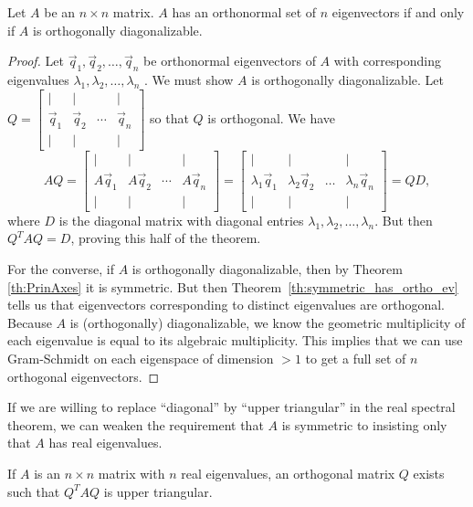 \documentclass{ximera}
\begin{document}
\begin{theorem}\label{th:PrinAxesOtherStuff}
Let $A$ be an $n \times n$ matrix.  $A$ has an orthonormal set of $n$ eigenvectors if and only if $A$ is orthogonally diagonalizable.

\begin{proof}
Let $\vec{q}_{1}, \vec{q}_{2}, \dots, \vec{q}_{n}$ be orthonormal eigenvectors of $A$ with corresponding eigenvalues $\lambda_1, \lambda_2, \ldots, \lambda_n$ .  We must show $A$ is orthogonally diagonalizable. Let $Q = \begin{bmatrix}
| & | &   & | \\
\vec{q}_1 & \vec{q}_2  & \cdots & \vec{q}_n \\
| & | &   & |
\end{bmatrix}$ so that $Q$ is orthogonal.  We have
$$AQ = \begin{bmatrix}
| & | &   & | \\
A\vec{q}_1 & A\vec{q}_2  & \cdots & A\vec{q}_n \\
| & | &   & |
\end{bmatrix} = \begin{bmatrix}
| & | &   & | \\
\lambda_1 \vec{q}_{1} & \lambda_2 \vec{q}_{2} & \dots & \lambda_n \vec{q}_{n} \\
| & | &   & |
\end{bmatrix}=QD, $$
where $D$ is the diagonal matrix with diagonal entries $\lambda_1, \lambda_2, \ldots, \lambda_n$.  But then $Q^TAQ=D$, proving this half of the theorem.

For the converse, if $A$ is orthogonally diagonalizable, then by Theorem \ref{th:PrinAxes} it is symmetric.  But then Theorem~\ref{th:symmetric_has_ortho_ev} tells us that eigenvectors corresponding to distinct eigenvalues are orthogonal.  Because $A$ is (orthogonally) diagonalizable, we know the geometric multiplicity of each eigenvalue is equal to its algebraic multiplicity.  This implies that we can use Gram-Schmidt on each eigenspace of dimension $> 1$ to get a full set of $n$ orthogonal eigenvectors.
\end{proof}
\end{theorem}

If we are willing to replace ``diagonal'' by ``upper triangular'' in the real spectral theorem, we can weaken the requirement that $A$ is symmetric to insisting only that $A$ has real eigenvalues.

\begin{theorem}\label{th:Schur}
If $A$ is an $n \times n$ matrix with $n$ real eigenvalues, an orthogonal matrix $Q$ exists such that $Q^{T}AQ$ is upper triangular.
\end{theorem}
\end{document}
